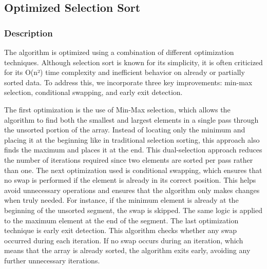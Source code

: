 \subsection{Optimized Selection Sort}

\subsubsection{Description}

The algorithm is optimized using a combination of different optimization techniques. Although selection sort is known for its simplicity, it is often criticized for its O(n²) time complexity and inefficient behavior on already or partially sorted data. To address this, we incorporate three key improvements: min-max selection, conditional swapping, and early exit detection.


The first optimization is the use of Min-Max selection, which allows the algorithm to find both the smallest and largest elements in a single pass through the unsorted portion of the array. Instead of locating only the minimum and placing it at the beginning like in traditional selection sorting, this approach also finds the maximum and places it at the end. This dual-selection approach reduces the number of iterations required since two elements are sorted per pass rather than one. The next optimization used is conditional swapping, which ensures that no swap is performed if the element is already in its correct position. This helps avoid unnecessary operations and ensures that the algorithm only makes changes when truly needed. For instance, if the minimum element is already at the beginning of the unsorted segment, the swap is skipped. The same logic is applied to the maximum element at the end of the segment. The last optimization technique is early exit detection. This algorithm checks whether any swap occurred during each iteration. If no swap occurs during an iteration, which means that the array is already sorted, the algorithm exits early, avoiding any further unnecessary iterations. 



